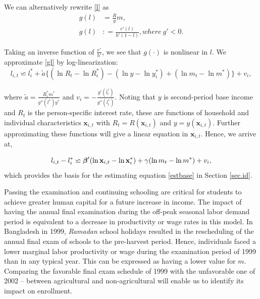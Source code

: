 \documentclass[12pt,letterpaper]{article}
\newcommand{\bfbeta}{\ensuremath{\mbox{\boldmath $\beta$}}}
\newcommand{\0}{\ensuremath{\mbox{\boldmath $0$}}}
\newcommand{\defeq}{\mathrel{\mathop:}=}
\begin{document}
We can alternatively rewrite \eqref{l} as
\begin{equation}
\begin{aligned}
g(l)    &=\frac{R}{y}m, \\
g(l)    &\defeq \frac{e'(l)}{h'(1-l)}, where \ g'<0.
\end{aligned}
\label{gl}
\end{equation}

Taking an inverse function of $\frac{e'}{h'}$, we see that $g(\cdot)$ is nonlinear in $l$. We approximate \eqref{gl} by log-linearization:
\[
 l_{i,t}\backsimeq  l^{*}_{i}+\tilde{a}\{(\ln R_{t}-\ln R^{*}_{i}) - (\ln y-\ln y^{*}_{i}) + (\ln m_{t}-\ln m^{*})\} + v_{i},
\]


where $\tilde{a}=\tfrac{R^{*}_{i}m^{*}}{g''(l^{*})y^{*}}$ and $v_{i}=-\tfrac{g'(l^{*}_{i})}{g''(l^{*}_{i})}$. Noting that $y$ is second-period base income and $R_{t}$ is the person-specific interest rate, these are functions of household and individual characteristics $\textbf{x}_{i,t}$ with $R_{t}=R(\textbf{x}_{i,t})$ and $y=y(\textbf{x}_{i,t})$. Further approximating these functions will give a linear equation in $\textbf{x}_{i,t}$. Hence, we arrive at,

\begin{equation}
 l_{i,t}- l^{*}_{i}\backsimeq \bfbeta'(\ln \textbf{x}_{i,t}-\ln \textbf{x}^{*}_{i}) + \gamma(\ln m_{t}-\ln m^{*}) + v_{i},
 \label{lsimeq}
\end{equation}
which provides the basis for the estimating equation \eqref{estbase} in Section \ref{sec.id}.

Passing the examination and continuing schooling are critical for students to achieve greater human capital for a future increase in income. The impact of having the annual final examination during the off-peak seasonal labor demand period is equivalent to a decrease in productivity or wage rates in this model. In Bangladesh in 1999, \textit{Ramadan} school holidays resulted in the rescheduling of the annual final exam of schools to the pre-harvest period. Hence, individuals faced a lower marginal labor productivity or wage during the examination period of 1999 than in any typical year. This can be expressed as having a lower value for $m$. Comparing the favorable final exam schedule of 1999 with the unfavorable one of 2002 -- between agricultural and non-agricultural will enable us to identify its impact on enrollment.

\end{document}

